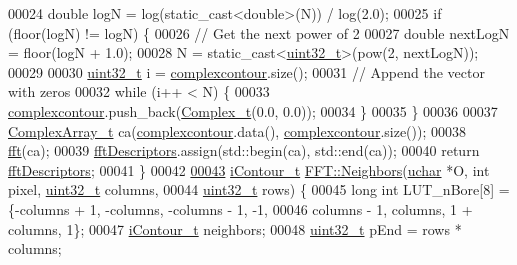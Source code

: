 \begin{DoxyCode}
00024   \textcolor{keywordtype}{double} logN = log(static\_cast<double>(N)) / log(2.0);
00025   \textcolor{keywordflow}{if} (floor(logN) != logN) \{
00026     \textcolor{comment}{// Get the next power of 2}
00027     \textcolor{keywordtype}{double} nextLogN = floor(logN + 1.0);
00028     N = \textcolor{keyword}{static\_cast<}\hyperlink{_soil_math_types_8h_a435d1572bf3f880d55459d9805097f62}{uint32\_t}\textcolor{keyword}{>}(pow(2, nextLogN));
00029 
00030     \hyperlink{_soil_math_types_8h_a435d1572bf3f880d55459d9805097f62}{uint32\_t} i = \hyperlink{class_soil_math_1_1_f_f_t_a48141f0c777ca86f2e536f88b509b639}{complexcontour}.size();
00031     \textcolor{comment}{// Append the vector with zeros}
00032     \textcolor{keywordflow}{while} (i++ < N) \{
00033       \hyperlink{class_soil_math_1_1_f_f_t_a48141f0c777ca86f2e536f88b509b639}{complexcontour}.push\_back(\hyperlink{_soil_math_types_8h_a26c307796ad803485b0376c90026d8f7}{Complex\_t}(0.0, 0.0));
00034     \}
00035   \}
00036 
00037   \hyperlink{_soil_math_types_8h_a5118c9f6b02a06945c93a3893e51febe}{ComplexArray\_t} ca(\hyperlink{class_soil_math_1_1_f_f_t_a48141f0c777ca86f2e536f88b509b639}{complexcontour}.data(), 
      \hyperlink{class_soil_math_1_1_f_f_t_a48141f0c777ca86f2e536f88b509b639}{complexcontour}.size());
00038   \hyperlink{class_soil_math_1_1_f_f_t_a48bc7ad948d820d6f87b3e353b6d1cd4}{fft}(ca);
00039   \hyperlink{class_soil_math_1_1_f_f_t_a466b360529319d0e6e3220f446f703be}{fftDescriptors}.assign(std::begin(ca), std::end(ca));
00040   \textcolor{keywordflow}{return} \hyperlink{class_soil_math_1_1_f_f_t_a466b360529319d0e6e3220f446f703be}{fftDescriptors};
00041 \}
00042 
\hypertarget{_f_f_t_8cpp_source_l00043}{}\hyperlink{class_soil_math_1_1_f_f_t_a45b32ad009154112d2fc4e467fc7c5ac}{00043} \hyperlink{_soil_math_types_8h_a1ade796add2f13888dfa9e6bde0bdc37}{iContour\_t} \hyperlink{class_soil_math_1_1_f_f_t_a45b32ad009154112d2fc4e467fc7c5ac}{FFT::Neighbors}(\hyperlink{_soil_math_types_8h_a65f85814a8290f9797005d3b28e7e5fc}{uchar} *O, \textcolor{keywordtype}{int} pixel, 
      \hyperlink{_soil_math_types_8h_a435d1572bf3f880d55459d9805097f62}{uint32\_t} columns,
00044                           \hyperlink{_soil_math_types_8h_a435d1572bf3f880d55459d9805097f62}{uint32\_t} rows) \{
00045   \textcolor{keywordtype}{long} \textcolor{keywordtype}{int} LUT\_nBore[8] = \{-columns + 1, -columns, -columns - 1, -1,
00046                            columns - 1,  columns,  1 + columns,  1\};
00047   \hyperlink{_soil_math_types_8h_a1ade796add2f13888dfa9e6bde0bdc37}{iContour\_t} neighbors;
00048   \hyperlink{_soil_math_types_8h_a435d1572bf3f880d55459d9805097f62}{uint32\_t} pEnd = rows * columns;

\end{DoxyCode}
